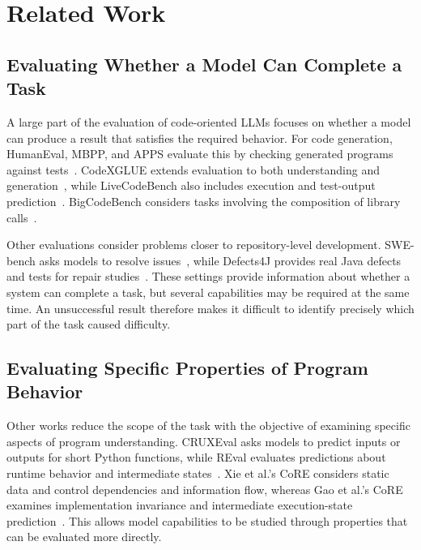 \section{Related Work}
\label{sec:related-work}

\subsection{Evaluating Whether a Model Can Complete a Task}

A large part of the evaluation of code-oriented LLMs focuses on whether a model can produce a result that satisfies the required behavior. For code generation, HumanEval, MBPP, and APPS evaluate this by checking generated programs against tests~\cite{chen2021codex,austin2021program,hendrycks2021apps}. CodeXGLUE extends evaluation to both understanding and generation~\cite{lu2021codexglue}, while LiveCodeBench also includes execution and test-output prediction~\cite{jain2025livecodebench}. BigCodeBench considers tasks involving the composition of library calls~\cite{zhuo2025bigcodebench}.

Other evaluations consider problems closer to repository-level development. SWE-bench asks models to resolve issues~\cite{jimenez2024swebench}, while Defects4J provides real Java defects and tests for repair studies~\cite{just2014defects4j}. These settings provide information about whether a system can complete a task, but several capabilities may be required at the same time. An unsuccessful result therefore makes it difficult to identify precisely which part of the task caused difficulty.

\subsection{Evaluating Specific Properties of Program Behavior}

Other works reduce the scope of the task with the objective of examining specific aspects of program understanding. CRUXEval asks models to predict inputs or outputs for short Python functions, while REval evaluates predictions about runtime behavior and intermediate states~\cite{gu2024cruxeval,chen2025reval}. Xie et al.'s CoRE considers static data and control dependencies and information flow, whereas Gao et al.'s CoRE examines implementation invariance and intermediate execution-state prediction~\cite{xie2025core,gao2026core}. This allows model capabilities to be studied through properties that can be evaluated more directly.

